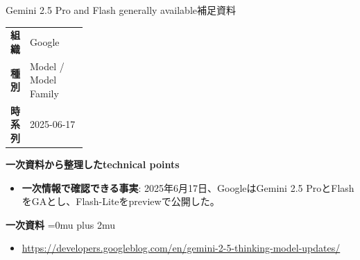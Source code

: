 \begin{technicalnote}{Gemini 2.5 Pro and Flash generally available}{補足資料}
\begingroup
\begin{tabularx}{\linewidth}{@{}>{\bfseries}p{0.22\linewidth}X@{}}
組織 & Google \\
種別 & Model / Model Family \\
時系列 & 2025-06-17 \\
\end{tabularx}
\smallskip
{\bfseries 一次資料から整理したtechnical points}
\begin{itemize}[leftmargin=1.5em,itemsep=0.35em]
\item \textbf{一次情報で確認できる事実}: 2025年6月17日、GoogleはGemini 2.5 ProとFlashをGAとし、Flash-Liteをpreviewで公開した。
\end{itemize}
\begin{samepage}
{\bfseries 一次資料}
\begingroup\sloppy
\Urlmuskip=0mu plus 2mu\relax
\begin{itemize}[leftmargin=1.5em,itemsep=0.25em]
\item {\scriptsize\url{https://developers.googleblog.com/en/gemini-2-5-thinking-model-updates/}}
\end{itemize}
\endgroup
\end{samepage}
\endgroup
\end{technicalnote}
\medskip
